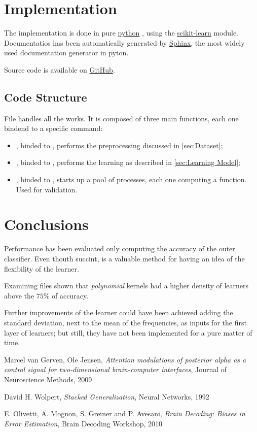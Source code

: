 \documentclass[10pt]{article}
\begin{document}
\section{Implementation}
The implementation is done in pure 
\href{https://python.org/}{python}
, using the
\href{http://scikit-learn.org/stable/}{scikit-learn}
module. Documentatios has been automatically generated by
\href{http://sphinx-doc.org/}{Sphinx}, the most widely used documentation generator in pyton.

Source code is available on 
\href{https://github.com/mmaker/braindecoding}{GitHub}.

\subsection{Code Structure}
File  handles all the works. It is composed of three main functions, each one bindend to a specific command: 
\begin{itemize}
\item {}, binded to , performs the preprocessing discussed in \ref{sec:Dataset};
\item {}, binded to , performs the learning as described in \ref{sec:Learning Model};
\item {}, binded to , starts up a pool of processes, each one computing a  function. Used for validation.
\end{itemize}

\section{Conclusions}
Performance has been evaluated only computing the accuracy of the outer classifier. Even thouth succint, is a valuable method for having an idea of the flexibility of the learner.


Examining files  shown that \emph{polynomial} kernels had a higher density of learners above the $75\%$ of accuracy.

Further improvements of the learner could have been achieved adding the standard deviation, next to the mean of the frequencies, as inputs for the first layer of learners; but still, they have not been implemented for a pure matter of time.



\begin{thebibliography}{9}

Marcel van Gerven, Ole Jensen,
\emph{Attention modulations of posterior alpha as a control signal for two-dimensional brain-computer interfaces},
Journal of Neuroscience Methods, 2009


David H. Wolpert,
\emph{Stacked Generalization},
Neural Networks, 1992

E. Olivetti, A. Mognon, S. Greiner and P. Avesani, 
\emph{Brain Decoding: Biases in Error Estimation}, 
Brain Decoding Workshop, 2010

\end{thebibliography}
\end{document}
